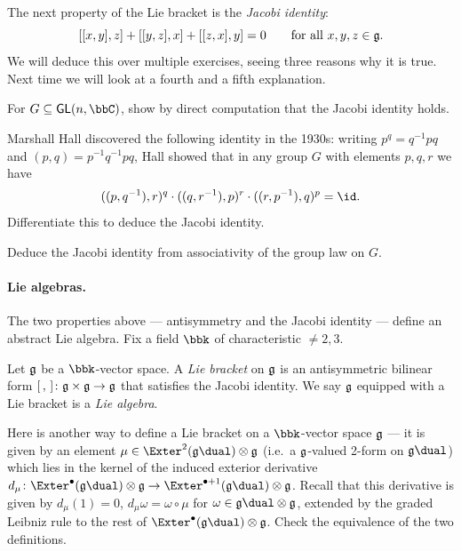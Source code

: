 The next property of the Lie bracket is the \emph{Jacobi identity}:
\[[[x,y],z]+[[y,z],x] + [[z,x],y]=0 \qquad \text{for all }x,y,z\in \mathfrak{g}.\] 
We will deduce this over multiple exercises, seeing three reasons why it is
true. Next time we will look at a fourth and a fifth explanation. 

\begin{exercise}
    For $G\subseteq \sf{GL}(n,\bbC)$, show by direct
    computation that the Jacobi identity holds.
\end{exercise}

\begin{exercise}
    Marshall Hall discovered the following identity in the 1930s: writing
    $p^q=q^{-1}pq$ and $(p,q)=p^{-1}q^{-1}pq$, Hall showed that in any
    group $G$ with elements $p,q,r$ we have
    \[((p,q^{-1}),r)^q \cdot ((q,r^{-1}),p)^r \cdot ((r,p^{-1}),q)^p=\id.\] 
    Differentiate this to deduce the Jacobi identity.
\end{exercise}

\begin{exercise}
    Deduce the Jacobi identity from associativity of the group law on $G$.
\end{exercise}

\paragraph{Lie algebras.} The two properties above --- antisymmetry and the
Jacobi identity --- define an abstract Lie algebra. Fix a field $\bbk$ of
characteristic $\neq 2,3$.

\begin{definition}
    Let $\mathfrak{g}$ be a $\bbk$-vector space. A \emph{Lie bracket} on $\mathfrak{g}$ is an
    antisymmetric bilinear form $[\,,\,]\colon \mathfrak{g}\times\mathfrak{g}\to \mathfrak{g}$ that
    satisfies the Jacobi identity. We say $\mathfrak{g}$ equipped with a Lie bracket is a
    \emph{Lie algebra}.
\end{definition}

\begin{exercise}
    Here is another way to define a Lie bracket on a $\bbk$-vector
    space $\mathfrak{g}$ --- it is given by an element $\mu\in \Exter^2(\frakg\dual)\otimes \frakg$
    (i.e.\ a $\mathfrak{g}$-valued 2-form on $\frakg\dual$) which lies in the kernel of the
    induced exterior derivative $d_\mu \colon \Exter^\bullet(\frakg\dual)\otimes \frakg \to
    \Exter^{\bullet+1}(\frakg\dual)\otimes \frakg$. Recall that this derivative is
    given by $d_\mu(1)=0$, $d_\mu\omega = \omega \circ \mu$ for $\omega\in
    \frakg\dual\otimes \frakg$, extended by the graded Leibniz rule to the rest of
    $\Exter^\bullet(\frakg\dual)\otimes \frakg$. Check the equivalence of the two
    definitions.
\end{exercise}

